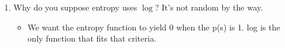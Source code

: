 \documentclass{article}
\begin{document}
\begin{enumerate}
\begin{itemize}
\end{itemize}
\item Why do you suppose entropy uses $\log$? It's not random by the way.
\begin{itemize}
    \item We want the entropy function to yield 0 when the p(s) is 1. log is the only function that fits that criteria.
\end{itemize}
\end{enumerate}
\end{document}
